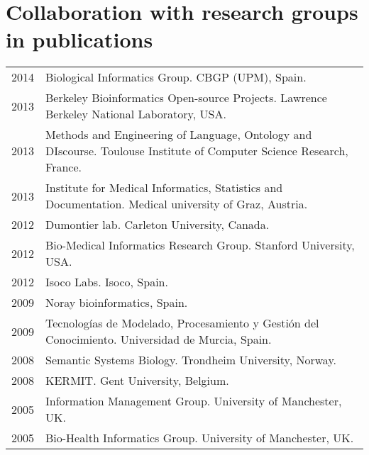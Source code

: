 \documentclass[11pt,fullpage]{article}
\begin{document}
\section*{Collaboration with research groups in publications}

\begin{longtable}{p{0.5in}|p{5.5in}}


2014 & Biological Informatics Group. CBGP (UPM), Spain. \\
2013 & Berkeley Bioinformatics Open-source Projects. Lawrence Berkeley National Laboratory, USA. \\
2013 & Methods and Engineering of Language, Ontology and DIscourse. Toulouse Institute of Computer Science Research, France. \\
2013 & Institute for Medical Informatics, Statistics and Documentation. Medical university of Graz, Austria. \\
2012	& Dumontier lab. Carleton University, Canada. \\
2012	& Bio-Medical Informatics Research Group. Stanford University, USA. \\
2012	& Isoco Labs. Isoco, Spain. \\
2009	& Noray bioinformatics, Spain. \\
2009	& Tecnolog\'ias de Modelado, Procesamiento y Gesti\'on del Conocimiento. Universidad de Murcia, Spain. \\
2008	& Semantic Systems Biology. Trondheim University, Norway. \\
2008	& KERMIT. Gent University, Belgium. \\
2005	& Information Management Group. University of Manchester, UK. \\
2005	& Bio-Health Informatics Group. University of Manchester, UK. \\

\end{longtable}
\end{document}
